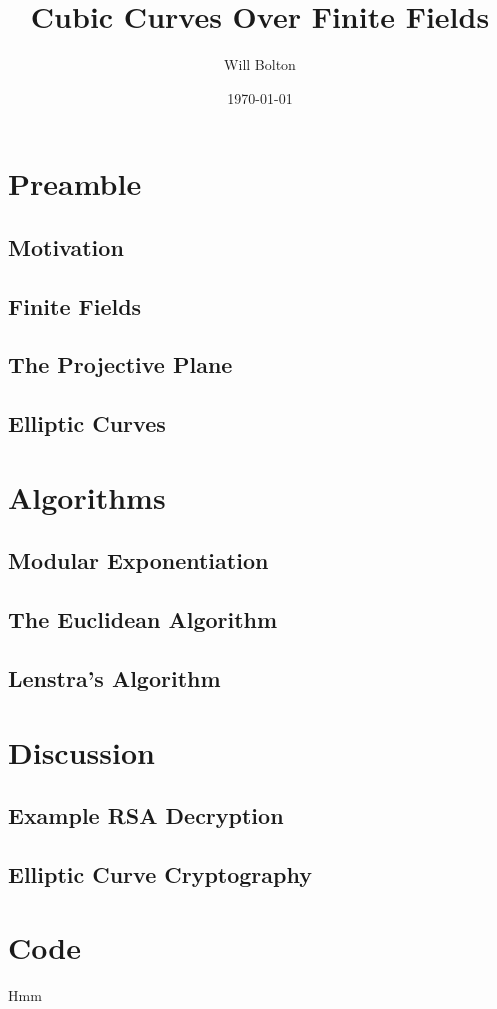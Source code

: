 \documentclass{article}
\title{Cubic Curves Over Finite Fields}
\author{Will Bolton}
\date{\today}
\begin{document}
\maketitle
\tableofcontents

\section{Preamble}
\subsection{Motivation}

\subsection{Finite Fields}

\subsection{The Projective Plane}

\subsection{Elliptic Curves}




\section{Algorithms}
\subsection{Modular Exponentiation}

\subsection{The Euclidean Algorithm}

\subsection{Lenstra's Algorithm}


\section{Discussion}
\subsection{Example RSA Decryption}

\subsection{Elliptic Curve Cryptography}


\appendix
\section{Code}
Hmm
\cite{silverman-rational}
\cite{silverman-arithmetic}
\cite{fraleigh2013}
\cite{goodman1998}
%


\end{document}
